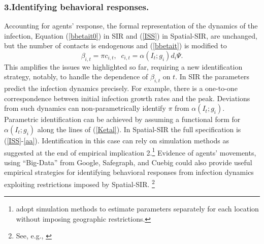 \documentclass[english,11pt]{article}
\begin{document}
\subsubsection*{3.\hspace{1ex}Identifying behavioral responses.} 
Accounting for agents' response, the formal representation of the dynamics of the infection, Equation (\ref{bbetait0}) in SIR and (\ref{ISS}) in Spatial-SIR, are unchanged, but the number of contacts is endogenous and   (\ref{bbetait}) is modified to  
\begin{equation} 
    \beta_{i,t}    =  \pi c_{i,t}, \; \;  c_{i,t}= \alpha (I_t;g_i) d_i \Psi. \label{aa} 
\end{equation}
 This amplifies the 
issues we highlighted so far, requiring a new identification strategy, notably, to handle the dependence of $\beta_{i,t}$ on $t$.
In SIR the parameters predict the infection dynamics precisely. For example, there is a one-to-one correspondence between initial infection growth rates and the peak. 
Deviations from such dynamics can non-parametrically identify $\pi$ from 
$\alpha (I_t;g_i)$. Parametric identification
can be achieved by assuming a functional form for 
$\alpha (I_t;g_i)$ along the lines of (\ref{Ketal}).
In Spatial-SIR the full specification is (\ref{ISS}-\ref{aa}). Identification in this case can
rely on simulation methods as suggested at the end of empirical
implication 2.\footnote{\cite{fernandez2020estimating} adopt simulation methods to estimate parameters separately for each location without imposing geographic restrictions.}
 Evidence of agents' movements, using ``Big-Data''
from Google, Safegraph, and Cuebig
could also provide useful empirical strategies for identifying behavioral responses from infection 
dynamics exploiting restrictions imposed by Spatial-SIR.%
\footnote{See, e.g., \cite{farboodi2020}}
\end{document}
